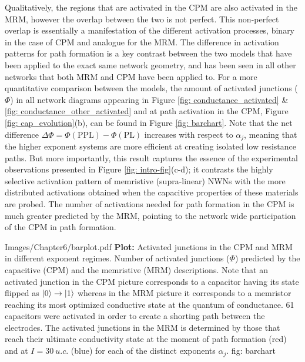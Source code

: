 Qualitatively, the regions that are activated in the CPM are also activated in the MRM, however the overlap between the two is not perfect. This non-perfect overlap is essentially a manifestation of the different activation processes, binary in the case of CPM and analogue for the MRM. The difference in activation patterns for path formation is a key contrast between the two models that have been applied to the exact same network geometry, and has been seen in all other networks that both MRM and CPM have been applied to. For a more quantitative comparison between the models, the amount of activated junctions ($\Phi$) in all network diagrams appearing in Figure \ref{fig: conductance_activated} \& \ref{fig: conductance_other_activated} and at path activation in the CPM, Figure \ref{fig: cap_evolution}(b), can be found in Figure \ref{fig: barchart}. Note that the net difference $\Delta \Phi = \Phi(\textrm{PPL}) - \Phi(\textrm{PL})$ increases with respect to $\alpha_j$, meaning that the higher exponent systems are more efficient at creating isolated low resistance paths. But more importantly, this result captures the essence of the experimental observations presented in Figure \ref{fig: intro-fig}(c-d); it contrasts the highly selective activation pattern of memristive (supra-linear) NWNs with the more distributed activations obtained when the capacitive properties of these materials are probed. The number of activations needed for path formation in the CPM is much greater predicted by the MRM, pointing to the network wide participation of the CPM in path formation. 

{Images/Chapter6/barplot.pdf}
{\textbf{Plot:} Activated junctions in the CPM and MRM in different exponent regimes.}
{Number of activated junctions ($\Phi$) predicted by the capacitive (CPM) and the memristive (MRM) descriptions. Note that an activated junction in the CPM picture corresponds to a capacitor having its state flipped as $|0\rangle\rightarrow |1\rangle$ whereas in the MRM picture it corresponds to a memristor reaching its most optimized conductive state at the quantum of conductance. 61 capacitors were activated in order to create a shorting path between the electrodes. The activated junctions in the MRM is determined by those that reach their ultimate conductivity state at the moment of path formation (red) and at $I = 30 ~u.c.$ (blue) for each of the distinct exponents $\alpha_j$.}
{fig: barchart}
